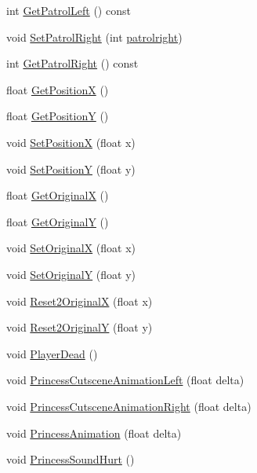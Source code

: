 \begin{DoxyCompactItemize}
int \hyperlink{classPrincessObject_a77858520ddb2f474a751565d1d5aacb0}{Get\+Patrol\+Left} () const 
\item 
void \hyperlink{classPrincessObject_a181ce8fdf642f6e457ce4046a52aa166}{Set\+Patrol\+Right} (int \hyperlink{classPrincessObject_a393424eb98d6c3f18409b828232b7da8}{patrolright})
\item 
int \hyperlink{classPrincessObject_a47b67626fb51e74b8da2494a931f1f35}{Get\+Patrol\+Right} () const 
\item 
float \hyperlink{classPrincessObject_a8fe6db722d044576a107ebed4d9efd90}{Get\+PositionX} ()
\item 
float \hyperlink{classPrincessObject_ab467215d25ae8ea54e55888fc78222db}{Get\+PositionY} ()
\item 
void \hyperlink{classPrincessObject_a0d6de4d9bc29139df74be40e2690026a}{Set\+PositionX} (float x)
\item 
void \hyperlink{classPrincessObject_a1b920b29beffdc9f5c776deea5a35c4d}{Set\+PositionY} (float y)
\item 
float \hyperlink{classPrincessObject_aad25e1f826feecfece875b3d7dd298cd}{Get\+OriginalX} ()
\item 
float \hyperlink{classPrincessObject_a7f54d3967732ffc550f2cff81ad9de78}{Get\+OriginalY} ()
\item 
void \hyperlink{classPrincessObject_aae0dd8158963c1dfe4777d408ebf536e}{Set\+OriginalX} (float x)
\item 
void \hyperlink{classPrincessObject_ad6aca332f7def4610e6c606340a3d296}{Set\+OriginalY} (float y)
\item 
void \hyperlink{classPrincessObject_a49e1e54a9bf9edcc265910a8ed745ee8}{Reset2\+OriginalX} (float x)
\item 
void \hyperlink{classPrincessObject_a9f20547ef95b7a485acaa384d8be8ba7}{Reset2\+OriginalY} (float y)
\item 
void \hyperlink{classPrincessObject_af5a278022062988e7ec7488d5472bd7a}{Player\+Dead} ()
\item 
void \hyperlink{classPrincessObject_a176ab57bcb1f0bc6d24ae0d57fbdce20}{Princess\+Cutscene\+Animation\+Left} (float delta)
\item 
void \hyperlink{classPrincessObject_aad006d856ca167f72aa674139bf6a6f1}{Princess\+Cutscene\+Animation\+Right} (float delta)
\item 
void \hyperlink{classPrincessObject_a9eb79323b7c11a05ca0bdf82b456d386}{Princess\+Animation} (float delta)
\item 
void \hyperlink{classPrincessObject_af01c581f6d1bb7070d9948fd32439441}{Princess\+Sound\+Hurt} ()

\end{DoxyCompactItemize}
